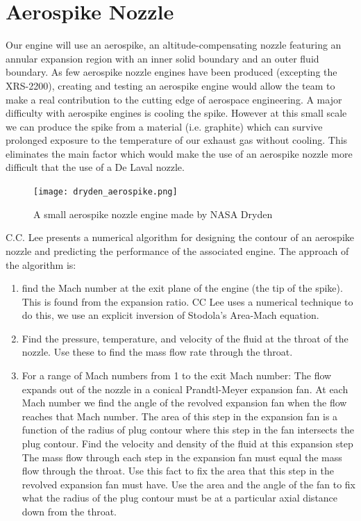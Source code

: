 \documentclass{article}
\begin{document}
\section{Aerospike Nozzle}
Our engine will use an aerospike, an altitude-compensating nozzle featuring an annular expansion region with an inner solid boundary and an outer fluid boundary. As few aerospike nozzle engines have been produced (excepting the XRS-2200), creating and testing an aerospike engine would allow the team to make a real contribution to the cutting edge of aerospace engineering. A major difficulty with aerospike engines is cooling the spike. However at this small scale we can produce the spike from a material (i.e. graphite) which can survive prolonged exposure to the temperature of our exhaust gas without cooling. This eliminates the main factor which would make the use of an aerospike nozzle more difficult that the use of a De Laval nozzle.\\
\begin{figure}[h!]
\centering
\texttt{[image: dryden\_aerospike.png]}
\caption{A small aerospike nozzle engine made by NASA Dryden} 
\label{dryden_aerospike}
\end{figure}
C.C. Lee \cite{CCLee} presents a numerical algorithm for designing the contour of an aerospike nozzle and predicting the performance of the associated engine. The approach of the algorithm is:
\begin{enumerate}
\item find the Mach number at the exit plane of the engine (the tip of the spike). This is found from the expansion ratio. CC Lee uses a numerical technique to do this, we use an explicit inversion of Stodola's Area-Mach equation.
\item Find the pressure, temperature, and velocity of the fluid at the throat of the nozzle. Use these to find the mass flow rate through the throat.
\item For a range of Mach numbers from 1 to the exit Mach number:
\subitem The flow expands out of the nozzle in a conical Prandtl-Meyer expansion fan. At each Mach number we find the angle of the revolved expansion fan when the flow reaches that Mach number. The area of this step in the expansion fan is a function of the radius of plug contour where this step in the fan intersects the plug contour. 
\subitem Find the velocity and density of the fluid at this expansion step
\subitem The mass flow through each step in the expansion fan must equal the mass flow through the throat. Use this fact to fix the area that this step in the revolved expansion fan must have. 
\subitem Use the area and the angle of the fan to fix what the radius of the plug contour must be at a particular axial distance down from the throat.
\end{enumerate} 
\end{document}
